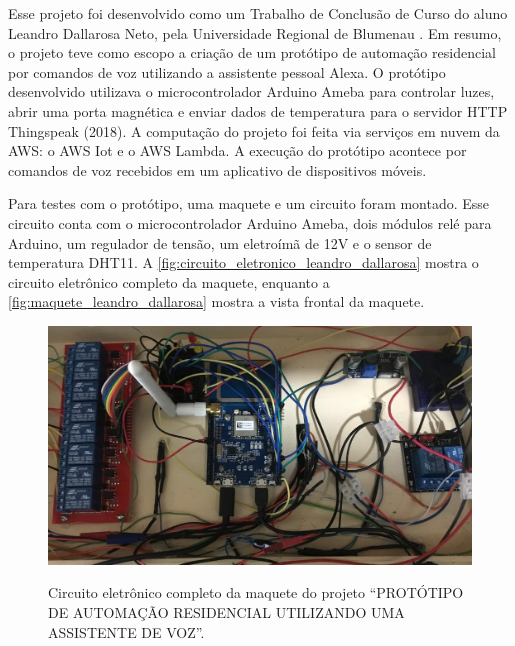 Esse projeto foi desenvolvido como um Trabalho de Conclusão de Curso do aluno Leandro Dallarosa Neto, pela Universidade Regional de Blumenau \cite{ref:031}. Em resumo, o projeto teve como escopo a criação de um protótipo de automação residencial por comandos de voz utilizando a assistente pessoal Alexa. O protótipo desenvolvido utilizava o microcontrolador Arduino Ameba para controlar luzes, abrir uma porta magnética e enviar dados de temperatura para o servidor HTTP Thingspeak (2018). A computação do projeto foi feita via serviços em nuvem da AWS: o AWS Iot e o AWS Lambda. A execução do protótipo acontece por comandos de voz recebidos em um aplicativo de dispositivos móveis.

Para testes com o protótipo, uma maquete e um circuito foram montado. Esse circuito conta com o microcontrolador Arduino Ameba, dois módulos relé para Arduino, um regulador de tensão, um eletroímã de 12V e o sensor de temperatura DHT11. A \autoref{fig:circuito_eletronico_leandro_dallarosa} mostra o circuito eletrônico completo da maquete, enquanto a \autoref{fig:maquete_leandro_dallarosa} mostra a vista frontal da maquete.

\begin{figure}[htbp]
    \centering
    \caption{Circuito eletrônico completo da maquete do projeto ``PROTÓTIPO DE AUTOMAÇÃO RESIDENCIAL UTILIZANDO UMA ASSISTENTE DE VOZ''.}
    \includegraphics[scale=0.4]{Imagens/circuito_eletronico_leandro_dallarosa.png}
    \label{fig:circuito_eletronico_leandro_dallarosa}
\end{figure}

